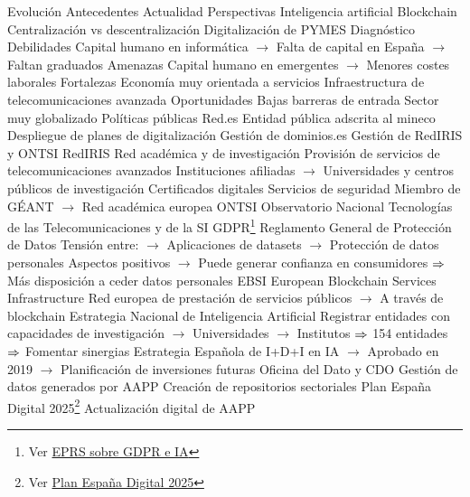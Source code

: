 \documentclass{nuevotema}
\begin{document}
\begin{esquemal}
			\3 Evolución
				\4 Antecedentes
				\4 Actualidad
				\4 Perspectivas
				\4[] Inteligencia artificial
				\4[] Blockchain
				\4[] Centralización vs descentralización
				\4[] Digitalización de PYMES
			\3 Diagnóstico
				\4 Debilidades
				\4[] Capital humano en informática
				\4[] $\to$ Falta de capital en España
				\4[] $\to$ Faltan graduados
				\4 Amenazas
				\4[] Capital humano en emergentes
				\4[] $\to$ Menores costes laborales
				\4 Fortalezas
				\4[] Economía muy orientada a servicios
				\4[] Infraestructura de telecomunicaciones avanzada
				\4 Oportunidades
				\4[] Bajas barreras de entrada
				\4[] Sector muy globalizado
			\3 Políticas públicas
				\4 Red.es
				\4[] Entidad pública adscrita al mineco
				\4[] Despliegue de planes de digitalización
				\4[] Gestión de dominios.es
				\4[] Gestión de RedIRIS y ONTSI
				\4 RedIRIS
				\4[] Red académica y de investigación
				\4[] Provisión de servicios de telecomunicaciones avanzados
				\4[] Instituciones afiliadas
				\4[] $\to$ Universidades y centros públicos de investigación
				\4[] Certificados digitales
				\4[] Servicios de seguridad
				\4[] Miembro de GÉANT
				\4[] $\to$ Red académica europea
				\4 ONTSI
				\4[] Observatorio Nacional Tecnologías de las Telecomunicaciones y de la SI
				\4 GDPR\footnote{Ver \href{https://www.europarl.europa.eu/thinktank/en/document.html?reference=EPRS_STU\%282020\%29641530}{EPRS sobre GDPR e IA}}
				\4[] Reglamento General de Protección de Datos
				\4[] Tensión entre:
				\4[] $\to$ Aplicaciones de datasets
				\4[] $\to$ Protección de datos personales
				\4[] Aspectos positivos
				\4[] $\to$ Puede generar confianza en consumidores
				\4[] $\Rightarrow$ Más disposición a ceder datos personales
				\4 EBSI
				\4[] European Blockchain Services Infrastructure
				\4[] Red europea de prestación de servicios públicos
				\4[] $\to$ A través de blockchain
				\4 Estrategia Nacional de Inteligencia Artificial
				\4[] Registrar entidades con capacidades de investigación
				\4[] $\to$ Universidades
				\4[] $\to$ Institutos
				\4[] $\Rightarrow$ 154 entidades
				\4[] $\Rightarrow$ Fomentar sinergias
				\4[] Estrategia Española de I+D+I en IA
				\4[] $\to$ Aprobado en 2019
				\4[] $\to$ Planificación de inversiones futuras
				\4 Oficina del Dato y CDO
				\4[] Gestión de datos generados por AAPP
				\4[] Creación de repositorios sectoriales
				\4 Plan España Digital 2025\footnote{Ver \href{https://www.lamoncloa.gob.es/presidente/actividades/Documents/2020/230720-Espa\%C3\%B1aDigital_2025.pdf}{Plan España Digital 2025}}
				\4[] Actualización digital de AAPP

\end{esquemal}
\end{document}
